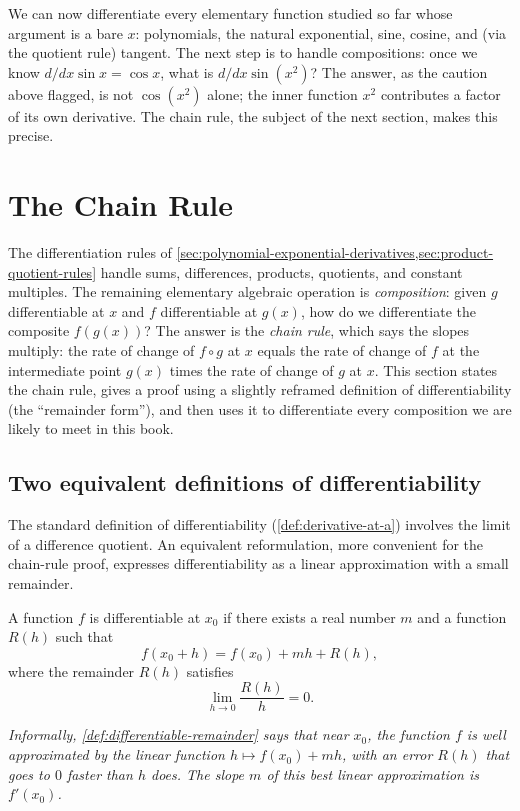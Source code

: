 We can now differentiate every elementary function studied so far whose argument is a bare \(x\): polynomials, the natural exponential, sine, cosine, and (via the quotient rule) tangent. The next step is to handle compositions: once we know \(d/dx \sin x = \cos x\), what is \(d/dx \sin(x^{2})\)? The answer, as the caution above flagged, is not \(\cos(x^{2})\) alone; the inner function \(x^{2}\) contributes a factor of its own derivative. The chain rule, the subject of the next section, makes this precise.

\section{The Chain Rule}\label{sec:chain-rule}

The differentiation rules of \cref{sec:polynomial-exponential-derivatives,sec:product-quotient-rules} handle sums, differences, products, quotients, and constant multiples. The remaining elementary algebraic operation is \emph{composition}: given \(g\) differentiable at \(x\) and \(f\) differentiable at \(g(x)\), how do we differentiate the composite \(f(g(x))\)? The answer is the \emph{chain rule}, which says the slopes multiply: the rate of change of \(f \circ g\) at \(x\) equals the rate of change of \(f\) at the intermediate point \(g(x)\) times the rate of change of \(g\) at \(x\). This section states the chain rule, gives a proof using a slightly reframed definition of differentiability (the ``remainder form''), and then uses it to differentiate every composition we are likely to meet in this book.

\subsection{Two equivalent definitions of differentiability}

The standard definition of differentiability (\cref{def:derivative-at-a}) involves the limit of a difference quotient. An equivalent reformulation, more convenient for the chain-rule proof, expresses differentiability as a linear approximation with a small remainder.

\begin{definition}\label{def:differentiable-remainder}
A function \(f\) is differentiable at \(x_{0}\) if there exists a real number \(m\) and a function \(R(h)\) such that
\[
f(x_{0} + h) = f(x_{0}) + m h + R(h),
\]
where the remainder \(R(h)\) satisfies
\[
\lim_{h \to 0} \frac{R(h)}{h} = 0.
\]

\emph{Informally, \cref{def:differentiable-remainder} says that near \(x_{0}\), the function \(f\) is well approximated by the linear function \(h \mapsto f(x_{0}) + mh\), with an error \(R(h)\) that goes to \(0\) faster than \(h\) does. The slope \(m\) of this best linear approximation is \(f'(x_{0})\).}
\end{definition}

